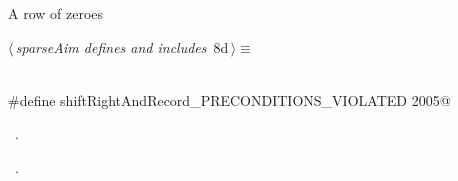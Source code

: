 \documentclass{article}
\begin{document}
\begin{description}
\begin{description}
\begin{flushleft}
\begin{minipage}{\linewidth}
\begin{list}{}{\setlength{\itemsep}{-\parsep}\setlength{\itemindent}{-\leftmargin}}
\item{}
\end{list}
\end{minipage}\vspace{4ex}
\end{flushleft}
\item[{\bf shiftRightAndRecord\_PRECONDITIONS\_VIOLATED}] A row of zeroes
\begin{flushleft} \small
\begin{minipage}{\linewidth}\label{scrap8}\raggedright\small
{} $\langle\,${\itshape sparseAim defines and includes}\nobreak\ {\footnotesize {8d}}$\,\rangle\equiv$
\vspace{-1ex}
\begin{list}{}{} \item
\mbox{}\verb@@\\
\mbox{}\verb@#define shiftRightAndRecord_PRECONDITIONS_VIOLATED 2005@\\
\mbox{}\verb@@{\NWsep}
\end{list}
\vspace{-1.5ex}
\footnotesize
\begin{list}{}{\setlength{\itemsep}{-\parsep}\setlength{\itemindent}{-\leftmargin}}
\item \NWtxtMacroDefBy\ .
\item \NWtxtMacroRefIn\ .


\end{list}
\end{minipage}
\end{flushleft}
\end{description}
\end{description}
\end{document}
